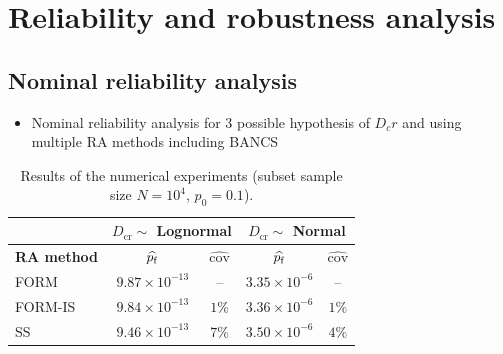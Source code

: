 \section{Reliability and robustness analysis}


\subsection{Nominal reliability analysis}
\begin{itemize}
    \item Nominal reliability analysis for 3 possible hypothesis of $D_cr$ and using multiple RA methods including BANCS
\end{itemize}


\begin{table}[h]
    \centering
    \caption{Results of the numerical experiments (subset sample size $N=10^4$, $p_0=0.1$).}
    \begin{tabular}{l||c|c|c|c}
              &  \multicolumn{2}{c|}{$D_{\mathrm{cr}} \sim $ \bf Lognormal} & \multicolumn{2}{c}{$D_{\mathrm{cr}} \sim $ \bf Normal}\\
    \hline
    \bf RA method & $\widehat{p_\mathrm{f}}$       & $\widehat{\mathrm{cov}}$    & $\widehat{p_\mathrm{f}}$       & $\widehat{\mathrm{cov}}$ \\
    \hline\hline
    FORM      & $9.87 \times 10^{-13}$ & --                    & $3.35 \times 10^{-6}$ & --\\
    \hline
    FORM-IS   & $9.84 \times 10^{-13}$ & $1 \%$                & $3.36 \times 10^{-6}$ & $1 \%$\\
    \hline
    SS        & $9.46 \times 10^{-13}$ & $7 \%$               & $3.50 \times 10^{-6}$ & $4 \%$\\ 
    \end{tabular}
    \label{tab:result_table}
\end{table}


